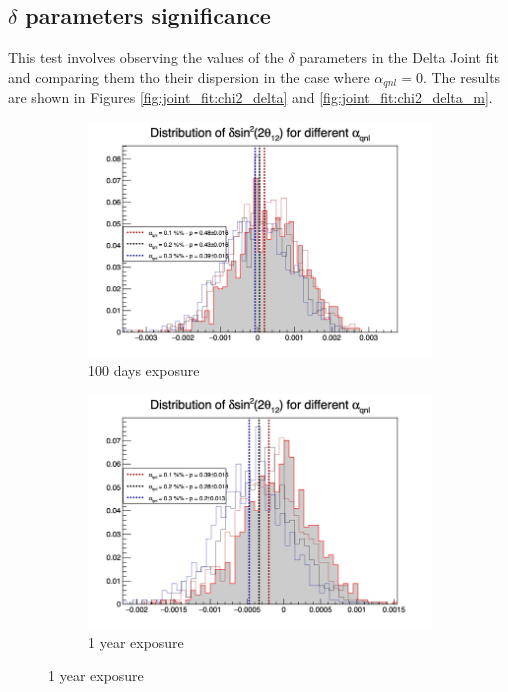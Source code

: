 \documentclass[../main.tex]{subfiles}
\begin{document}
\subsection{$\delta$ parameters significance}

This test involves observing the values of the $\delta$ parameters in the Delta Joint fit and comparing them tho their dispersion in the case where $\alpha_{qnl} = 0$. The results are shown in Figures \ref{fig:joint_fit:chi2_delta} and \ref{fig:joint_fit:chi2_delta_m}.

\begin{figure}[th]
  \centering
  \begin{subfigure}[t]{0.48\linewidth}
    \includegraphics[width=\linewidth]{images/joint_fit/stat_tests/chi2_delta_100d.png}
    \caption{100 days exposure}
  \end{subfigure}
  \begin{subfigure}[t]{0.48\linewidth}
    \includegraphics[width=\linewidth]{images/joint_fit/stat_tests/chi2_delta_1y.png}
    \caption{1 year exposure}
  \end{subfigure}



\end{figure}
\end{document}
